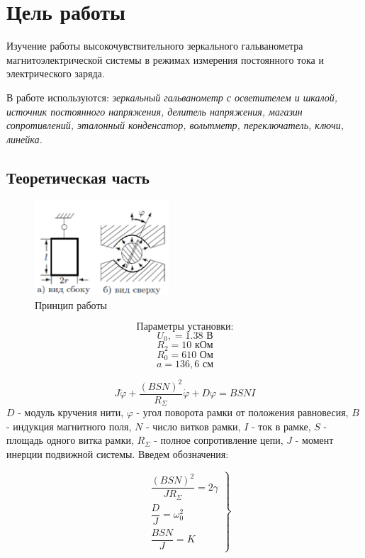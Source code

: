 \documentclass[a4paper, 12pt]{article}
\begin{document}



\section{Цель работы}
Изучение работы высокочувствительного зеркального гальванометра магнитоэлектрической системы в режимах измерения постоянного тока и электрического заряда.

В работе используются: \textit{зеркальный гальванометр с осветителем и шкалой, источник постоянного напряжения, делитель напряжения, магазин сопротивлений, эталонный конденсатор, вольтметр, переключатель, ключи, линейка.}


\subsection*{Теоретическая часть}

\begin{figure}
\includegraphics[width=5cm]{t}
\caption{Принцип работы}
\end{figure} 

		$$\text{Параметры установки:}$$
$$U_0,  = 1.38 \text{ В}$$
$$R_2 = 10 \text{ кОм}$$
$$R_0 = 610 \text{ Ом}$$
$$a = 136,6 \text{ см}$$
\vspace{1 cm}

\begin{equation}
J \ddot{\varphi} + \dfrac{\left(BSN\right)^2}{R_{\Sigma}} \dot{\varphi} + D\varphi = BSNI
\end{equation}
$D$ - модуль кручения нити, $\varphi$ - угол поворота рамки от положения равновесия, $B$ - индукция магнитного поля, $N$ - число витков рамки, $I$ - ток в рамке, $S$ - площадь одного витка рамки, $R_{\Sigma}$ - полное сопротивление цепи, $J$ - момент инерции подвижной системы.
Введем обозначения:

\begin{equation}
\left.
\begin{aligned}
&\dfrac{(BSN)^2}{JR_{\Sigma}} = 2\gamma \\
&\dfrac{D}{J} = \omega_0^2 \\
&\dfrac{BSN}{J} = K 
\end{aligned}
\right\}
\end{equation}
\end{document}
